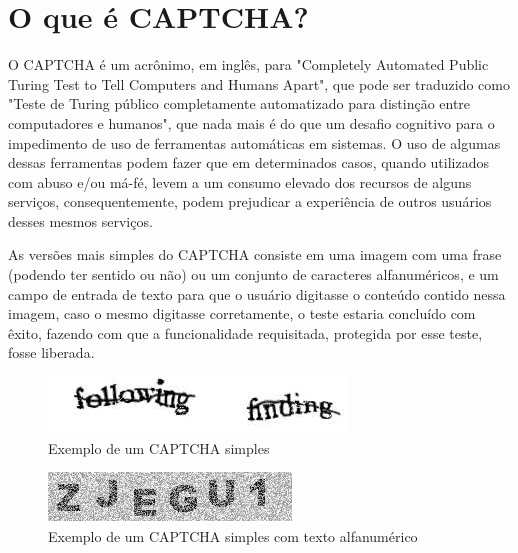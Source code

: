 \section{O que é CAPTCHA?}
\label{secao-captcha-definicao}

O CAPTCHA\cite{captchaWikipedia} é um acrônimo, em inglês, para "Completely Automated Public Turing Test to Tell Computers and Humans Apart", que pode ser traduzido como "Teste de Turing público completamente automatizado para distinção entre computadores e humanos", que nada mais é do que um desafio cognitivo para o impedimento de uso de ferramentas automáticas em sistemas. O uso de algumas dessas ferramentas podem fazer que em determinados casos, quando utilizados com abuso e/ou má-fé, levem a um consumo elevado dos recursos de alguns serviços, consequentemente, podem prejudicar a experiência de outros usuários desses mesmos serviços.

As versões mais simples do CAPTCHA consiste em uma imagem com uma frase (podendo ter sentido ou não) ou um conjunto de caracteres alfanuméricos\cite{captchaTecmundo}, e um campo de entrada de texto para que o usuário digitasse o conteúdo contido nessa imagem, caso o mesmo digitasse corretamente, o teste estaria concluído com êxito, fazendo com que a funcionalidade requisitada, protegida por esse teste, fosse liberada.

\begin{figure}[h]
    \centering
    \includegraphics[scale=0.5]{tcc/figures/captcha/captcha-frase.jpg}
    \caption{Exemplo de um CAPTCHA simples}
    \label{fig-exemplo-captcha-simples}
\end{figure}

\begin{figure}[h]
    \centering
    \includegraphics[scale=0.5]{tcc/figures/captcha/captcha-alfanumerico.png}
    \caption{Exemplo de um CAPTCHA simples com texto alfanumérico}
    \label{fig-exemplo-captcha-alfanumerico}
\end{figure}

